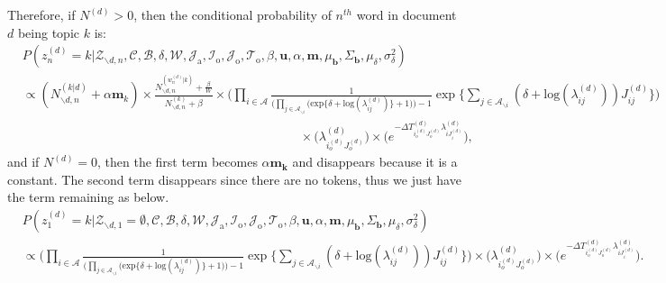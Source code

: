 \documentclass[a4paper]{article}
\begin{document}
 Therefore, if $N^{(d)} > 0$, then the conditional probability of $n^{th}$ word in document $d$ being topic $k$ is:
 \begin{equation}
 \begin{aligned}
  &P(z^{(d)}_n=k|\mathcal{Z}_{\backslash d, n},   \mathcal{C},   \mathcal{B}, \delta, \mathcal{W}, \mathcal{J}_{\mbox{a}}, \mathcal{I}_{\mbox{o}}, \mathcal{J}_{\mbox{o}}, \mathcal{T}_{\mbox{o}}, \beta, \boldsymbol{u}, \alpha, \boldsymbol{m},  \mu_{\boldsymbol{b}}, \Sigma_{\boldsymbol{b}}, \mu_\delta, \sigma^2_\delta)\\&\propto (N^{(k|d)}_{\backslash d, n}+\alpha \boldsymbol{m}_k)\times \frac{N^{(w_n^{(d)}|k)}_{\backslash d, n}+\frac{\beta}{W} }{N^{(k)}_{\backslash d, n}+\beta}\times \Big(\prod_{i\in \mathcal{A}} \frac{1}{\Big(\prod_{j \in \mathcal{A}_{\backslash i}} \Big(\mbox{exp}\{\delta+\mbox{log}(\lambda_{ij}^{(d)})\} + 1\Big)\Big)-1}\exp\Big\{\sum_{j \in \mathcal{A}_{\backslash i}} (\delta+\mbox{log}(\lambda_{ij}^{(d)}))J_{ij}^{(d)} \Big\}\Big)\\&\quad\quad\quad\quad\quad\quad\quad\quad\quad\quad\quad\quad\quad\quad\quad\quad\quad\quad\quad\quad\quad\quad\times \Big(\lambda^{(d)}_{i_o^{(d)}J_{o}^{(d)}}\Big)\times \Big(e^{-\Delta T^{(d)}_{i_o^{(d)}J_o^{(d)}}\lambda^{(d)}_{iJ^{(d)}_{i}}}\Big), 
 \end{aligned}
 \end{equation}
 and if $N^{(d)} = 0$, then the first term becomes $\alpha\boldsymbol{m_k}$ and disappears because it is a constant. The second term disappears since there are no tokens, thus we just have the term remaining as below.
  \begin{equation}
  \begin{aligned}
  &P(z^{(d)}_1=k|\mathcal{Z}_{\backslash d, 1}=\emptyset,   \mathcal{C},   \mathcal{B}, \delta, \mathcal{W}, \mathcal{J}_{\mbox{a}}, \mathcal{I}_{\mbox{o}}, \mathcal{J}_{\mbox{o}}, \mathcal{T}_{\mbox{o}}, \beta, \boldsymbol{u}, \alpha, \boldsymbol{m},  \mu_{\boldsymbol{b}}, \Sigma_{\boldsymbol{b}}, \mu_\delta, \sigma^2_\delta)\\&\propto\Big( \prod_{i\in \mathcal{A}}\frac{1}{\Big(\prod_{j \in \mathcal{A}_{\backslash i}} \Big(\mbox{exp}\{\delta+\mbox{log}(\lambda_{ij}^{(d)})\} + 1\Big)\Big)-1}\exp\Big\{\sum_{j \in \mathcal{A}_{\backslash i}} (\delta+\mbox{log}(\lambda_{ij}^{(d)}))J_{ij}^{(d)} \Big\}\Big)\times \Big(\lambda^{(d)}_{i_o^{(d)}J_{o}^{(d)}}\Big)\times \Big(e^{-\Delta T^{(d)}_{i_o^{(d)}J_o^{(d)}}\lambda^{(d)}_{iJ^{(d)}_{i}}}\Big).
  \end{aligned}
  \end{equation}
\end{document}
